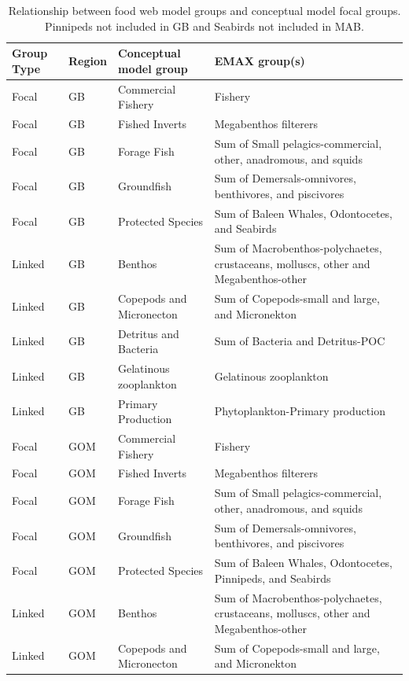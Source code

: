 \documentclass[
]{book}
\begin{document}
\begin{landscape}\begin{table}

\caption{\label{tab:groups}Relationship between food web model groups and conceptual model focal groups. Pinnipeds not included in GB and Seabirds not included in MAB.}
\centering
\fontsize{8}{10}\selectfont
\begin{tabular}[t]{llll}
\toprule
Group Type & Region & Conceptual model group & EMAX group(s)\\
\midrule
Focal & GB & Commercial Fishery & Fishery\\
Focal & GB & Fished Inverts & Megabenthos filterers\\
Focal & GB & Forage Fish & Sum of Small pelagics-commercial, other, anadromous, and squids\\
Focal & GB & Groundfish & Sum of Demersals-omnivores, benthivores, and piscivores\\
Focal & GB & Protected Species & Sum of Baleen Whales, Odontocetes, and Seabirds\\
\addlinespace
Linked & GB & Benthos & Sum of Macrobenthos-polychaetes, crustaceans, molluscs, other and Megabenthos-other\\
Linked & GB & Copepods and Micronecton & Sum of Copepods-small and large, and Micronekton\\
Linked & GB & Detritus and Bacteria & Sum of Bacteria and Detritus-POC\\
Linked & GB & Gelatinous zooplankton & Gelatinous zooplankton\\
Linked & GB & Primary Production & Phytoplankton-Primary production\\
\addlinespace
Focal & GOM & Commercial Fishery & Fishery\\
Focal & GOM & Fished Inverts & Megabenthos filterers\\
Focal & GOM & Forage Fish & Sum of Small pelagics-commercial, other, anadromous, and squids\\
Focal & GOM & Groundfish & Sum of Demersals-omnivores, benthivores, and piscivores\\
Focal & GOM & Protected Species & Sum of Baleen Whales, Odontocetes, Pinnipeds, and Seabirds\\
\addlinespace
Linked & GOM & Benthos & Sum of Macrobenthos-polychaetes, crustaceans, molluscs, other and Megabenthos-other\\
Linked & GOM & Copepods and Micronecton & Sum of Copepods-small and large, and Micronekton\\

\end{tabular}
\end{table}
\end{landscape}
\end{document}

